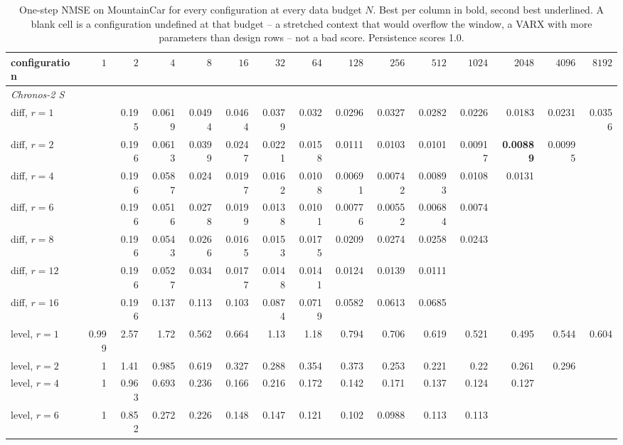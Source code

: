 \begin{table}[t]
\centering\scriptsize
\caption{One-step NMSE on MountainCar for every configuration at every data budget $N$. Best per column in bold, second best underlined. A blank cell is a configuration undefined at that budget -- a stretched context that would overflow the window, a VARX with more parameters than design rows -- not a bad score. Persistence scores 1.0.}
\label{tab:grid-mountaincar}
\begin{tabular}{lrrrrrrrrrrrrrr}
\toprule
configuration & $1$ & $2$ & $4$ & $8$ & $16$ & $32$ & $64$ & $128$ & $256$ & $512$ & $1024$ & $2048$ & $4096$ & $8192$ \\
\midrule
\multicolumn{15}{l}{\textit{Chronos-2 S}} \\
\quad diff, $r{=}1$ &  & 0.195 & 0.0619 & 0.0494 & 0.0464 & 0.0379 & 0.032 & 0.0296 & 0.0327 & 0.0282 & 0.0226 & 0.0183 & 0.0231 & 0.0356 \\
\quad diff, $r{=}2$ &  & 0.196 & 0.0613 & 0.0399 & 0.0247 & 0.0221 & 0.0158 & 0.0111 & 0.0103 & 0.0101 & 0.00917 & \textbf{0.00889} & 0.00995 &  \\
\quad diff, $r{=}4$ &  & 0.196 & 0.0587 & 0.024 & 0.0197 & 0.0162 & 0.0108 & 0.00691 & 0.00742 & 0.00893 & 0.0108 & 0.0131 &  &  \\
\quad diff, $r{=}6$ &  & 0.196 & 0.0516 & 0.0278 & 0.0199 & 0.0138 & 0.0101 & 0.00776 & 0.00552 & 0.00684 & 0.0074 &  &  &  \\
\quad diff, $r{=}8$ &  & 0.196 & 0.0543 & 0.0266 & 0.0165 & 0.0153 & 0.0175 & 0.0209 & 0.0274 & 0.0258 & 0.0243 &  &  &  \\
\quad diff, $r{=}12$ &  & 0.196 & 0.0527 & 0.034 & 0.0177 & 0.0148 & 0.0141 & 0.0124 & 0.0139 & 0.0111 &  &  &  &  \\
\quad diff, $r{=}16$ &  & 0.196 & 0.137 & 0.113 & 0.103 & 0.0874 & 0.0719 & 0.0582 & 0.0613 & 0.0685 &  &  &  &  \\
\quad level, $r{=}1$ & 0.999 & 2.57 & 1.72 & 0.562 & 0.664 & 1.13 & 1.18 & 0.794 & 0.706 & 0.619 & 0.521 & 0.495 & 0.544 & 0.604 \\
\quad level, $r{=}2$ & 1 & 1.41 & 0.985 & 0.619 & 0.327 & 0.288 & 0.354 & 0.373 & 0.253 & 0.221 & 0.22 & 0.261 & 0.296 &  \\
\quad level, $r{=}4$ & 1 & 0.963 & 0.693 & 0.236 & 0.166 & 0.216 & 0.172 & 0.142 & 0.171 & 0.137 & 0.124 & 0.127 &  &  \\
\quad level, $r{=}6$ & 1 & 0.852 & 0.272 & 0.226 & 0.148 & 0.147 & 0.121 & 0.102 & 0.0988 & 0.113 & 0.113 &  &  &  \\

\end{tabular}
\end{table}
